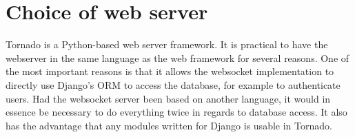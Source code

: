 \section{Choice of web server}
Tornado\cite{tornadoweb11} is a Python-based web server framework. 
It is practical to have the webserver in the same language as the web framework 
for several reasons. One of the most important reasons is that it allows the 
websocket implementation to directly use Django's ORM to access the database, 
for example to authenticate users. Had the websocket server been based on 
another language, it would in essence be necessary to do everything twice in regards to database access. It also has the advantage that any modules written for Django is 
usable in Tornado.